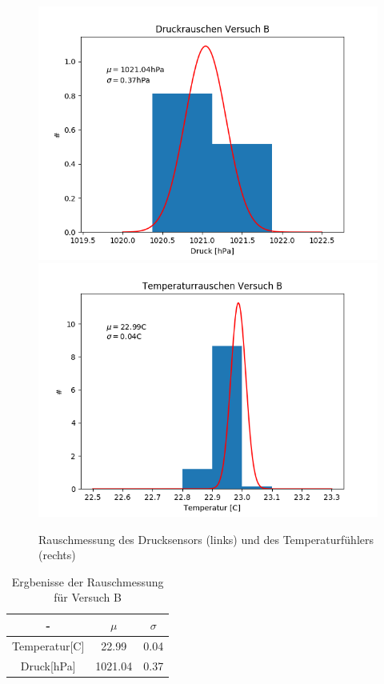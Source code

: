 \documentclass[12pt,a4paper]{article}
\begin{document}
\begin{figure}
\includegraphics[scale=0.5]{Bilder/DruckrauschenB}
\includegraphics[scale=0.5]{Bilder/TemprauschenB}
\caption[Rauschmessung Versuch B]{Rauschmessung des Drucksensors (links) und des Temperaturfühlers (rechts)}
\label{fig:RauschenB}
\end{figure}

\begin{table}
\begin{center}
\begin{tabular}{|c|c|c|}
\hline 
- & $\mu$ & $\sigma$\\ 
\hline 
Temperatur[C] & 22.99 & 0.04 \\ 
\hline 
Druck[hPa] & 1021.04 & 0.37\\ 
\hline 
\end{tabular}
\caption[Tabelle Rauschenmessung B]{Ergbenisse der Rauschmessung für Versuch B}
\label{tab:RauschenB}
\end{center}
\end{table}
\end{document}
